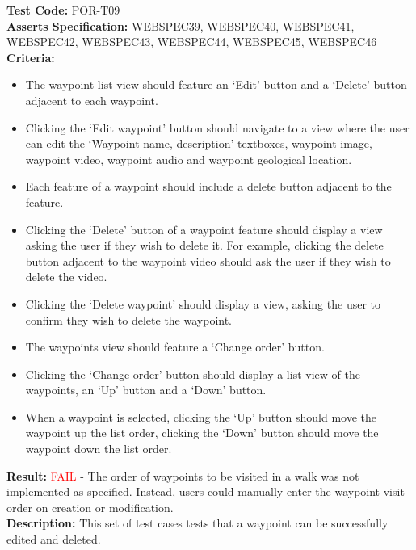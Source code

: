 \documentclass[11pt,a4paper]{report}
\begin{document}
\label{test:POR-T09}
\noindent\textbf{Test Code:} POR-T09\\
\textbf{Asserts Specification:} WEBSPEC39, WEBSPEC40, WEBSPEC41, WEBSPEC42, WEBSPEC43, WEBSPEC44, WEBSPEC45, WEBSPEC46\\ 
\textbf{Criteria:} \begin{itemize}
                     \item The waypoint list view should feature an `Edit' button and a `Delete' button adjacent to each waypoint.
                     \item Clicking the `Edit waypoint' button should navigate to a view where the user can edit the `Waypoint name, description' textboxes, waypoint image, waypoint video, waypoint audio and waypoint geological location.
                     \item Each feature of a waypoint should include a delete button adjacent to the feature.
                     \item Clicking the `Delete' button of a waypoint feature should display a view asking the user if they wish to delete it. For example, clicking the delete button adjacent to the waypoint video should ask the user if they wish to delete the video.
                     \item Clicking the `Delete waypoint' should display a view, asking the user to confirm they wish to delete the waypoint.
                     \item The waypoints view should feature a `Change order' button.
                     \item Clicking the `Change order' button should display a list view of the waypoints, an `Up' button and a `Down' button.
                     \item When a waypoint is selected, clicking the `Up' button should move the waypoint up the list order, clicking the `Down' button should move the waypoint down the list order.
                   \end{itemize}  
\textbf{Result:} \textcolor{red}{FAIL} - The order of waypoints to be visited in a walk was not implemented as specified. Instead, users could manually enter the waypoint visit order on creation or modification.\\
\textbf{Description:} This set of test cases tests that a waypoint can be successfully edited and deleted. \\
\end{document}
